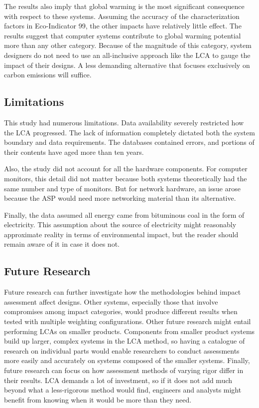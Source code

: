 \documentclass[final,journal,10pt,letterpaper,oneside,twocolumn,compsoc]%
{IEEEtran}
\begin{document}
The results also imply that global warming is the most significant consequence
with respect to these systems. Assuming the accuracy of the  characterization
factors in Eco-Indicator 99, the other impacts have relatively little effect.
The results suggest that computer systems contribute to global warming potential
more than any other category. Because of the magnitude of this category, system
designers do not need to use an all-inclusive approach like the LCA to
gauge the impact of their designs. A less demanding alternative that focuses
exclusively on carbon emissions will suffice.

\subsection{Limitations}
This study had numerous limitations. Data availability severely restricted how
the LCA progressed. The lack of information completely dictated both the system
boundary and data requirements. The databases contained errors, and portions of
their
contents have aged more than ten years.

Also, the study did not account for all the
hardware components. For computer monitors, this detail did not matter because
both systems theoretically had the same number and type of monitors. But for
network hardware, an issue arose because the ASP would need more networking
material
than its alternative.

Finally, the data assumed all energy came from bituminous coal in the form of
electricity. This assumption about the source of electricity might
reasonably approximate reality in terms
of environmental impact, but the reader should remain aware of it in case it
does not.

\subsection{Future Research}
Future research can further investigate how the methodologies behind impact
assessment affect designs. Other systems, especially those that involve
compromises among impact categories, would produce different results when
tested with multiple weighting configurations. Other future research might
entail performing LCAs on smaller products. Components from smaller product
systems build up larger, complex systems in the LCA method, so having a
catalogue of research on individual parts would enable researchers to conduct
assessments more easily and accurately on systems composed of the smaller
systems. Finally, future research can focus on
how assessment methods of varying rigor differ in their results. LCA demands
a lot of investment, so if
it does not add much beyond what a less-rigorous method would find,
engineers and analysts might benefit from knowing when it would be more than
they need.
\end{document}
